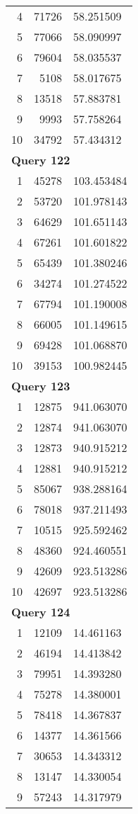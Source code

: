 \begin{longtable}[{p}]{@{}rrp{}@{}}
4 & 71726 & 58.251509 \\
5 & 77066 & 58.090997 \\
6 & 79604 & 58.035537 \\
7 & 5108 & 58.017675 \\
8 & 13518 & 57.883781 \\
9 & 9993 & 57.758264 \\
10 & 34792 & 57.434312 \\
\midrule
\multicolumn{3}{l}{\bfseries Query 122} \\
1 & 45278 & 103.453484 \\
2 & 53720 & 101.978143 \\
3 & 64629 & 101.651143 \\
4 & 67261 & 101.601822 \\
5 & 65439 & 101.380246 \\
6 & 34274 & 101.274522 \\
7 & 67794 & 101.190008 \\
8 & 66005 & 101.149615 \\
9 & 69428 & 101.068870 \\
10 & 39153 & 100.982445 \\
\midrule
\multicolumn{3}{l}{\bfseries Query 123} \\
1 & 12875 & 941.063070 \\
2 & 12874 & 941.063070 \\
3 & 12873 & 940.915212 \\
4 & 12881 & 940.915212 \\
5 & 85067 & 938.288164 \\
6 & 78018 & 937.211493 \\
7 & 10515 & 925.592462 \\
8 & 48360 & 924.460551 \\
9 & 42609 & 923.513286 \\
10 & 42697 & 923.513286 \\
\midrule
\multicolumn{3}{l}{\bfseries Query 124} \\
1 & 12109 & 14.461163 \\
2 & 46194 & 14.413842 \\
3 & 79951 & 14.393280 \\
4 & 75278 & 14.380001 \\
5 & 78418 & 14.367837 \\
6 & 14377 & 14.361566 \\
7 & 30653 & 14.343312 \\
8 & 13147 & 14.330054 \\
9 & 57243 & 14.317979 \\

\end{longtable}
